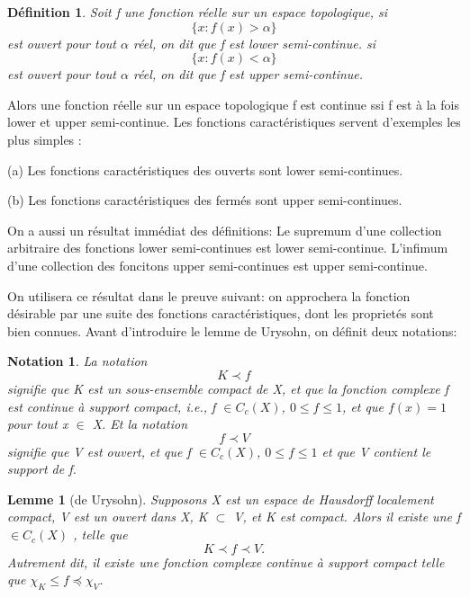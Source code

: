 \documentclass{article}
\newtheorem{definition}{Définition}[section]
\newtheorem*{lemma}{Lemme}
\newtheorem{notation}{Notation}
\begin{document}
\begin{definition}
Soit f une fonction réelle sur un espace topologique, si 
\[\{ x:f(x)>\alpha \}\]
est ouvert pour tout $\alpha$ réel, on dit que f est lower semi-continue.
si 
\[\{ x:f(x)<\alpha \} \]
est ouvert pour tout $\alpha$ réel, on dit que f est upper semi-continue.
\end{definition}
Alors une fonction réelle sur un espace topologique f est continue ssi f est à la fois lower et upper semi-continue. Les fonctions caractéristiques servent d'exemples les plus simples : \par
(a) Les fonctions caractéristiques des ouverts sont lower semi-continues.\par
(b) Les fonctions caractéristiques des fermés sont upper semi-continues.\par
On a aussi un résultat immédiat des définitions: Le supremum d'une collection arbitraire des fonctions lower semi-continues est lower semi-continue. L'infimum d'une collection des foncitons upper semi-continues est upper semi-continue. \par
On utilisera ce résultat dans le preuve suivant: on approchera la fonction désirable par une suite des fonctions caractéristiques, dont les proprietés sont bien connues.
Avant d'introduire le lemme de Urysohn, on définit deux notations:
\begin{notation}
La notation 
\[K \prec f\]
signifie que K est un sous-ensemble compact de X, et que la fonction complexe f est continue à support compact, i.e., f $\in C_{c}( X ) $, $ 0 \leq  f \leq  1$, et que $f( x ) = 1 $ pour tout x $\in$ X. Et la notation 
\[f \prec V\]
signifie que V est ouvert, et que f $\in C_{c}( X )$, $ 0 \leq  f \leq  1$ et que V contient le support de f. 
\end{notation}


\begin{lemma}[de Urysohn]
Supposons X est un espace de Hausdorff localement compact, V est un ouvert dans X, K $\subset$ V, et K est compact. Alors il existe une f $\in C_{c}(X)$ , telle que 
\[K\prec f \prec V .\]
Autrement dit, il existe une fonction complexe continue à support compact telle que $\chi _{K} \leq f \preceq  \chi _{V}$. 
\end{lemma}
\end{document}

